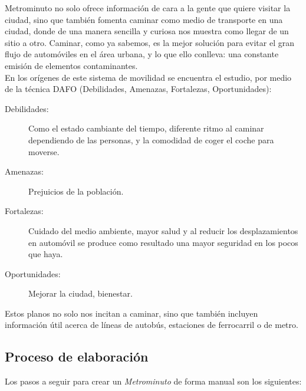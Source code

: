 Metrominuto no solo ofrece información de cara a la gente que quiere visitar la ciudad, sino que también fomenta caminar como medio de transporte en una ciudad, donde de una manera sencilla y curiosa nos muestra como llegar de un sitio a otro. Caminar, como ya sabemos, es la mejor solución para evitar el gran flujo de automóviles en el área urbana, y lo que ello conlleva: una constante emisión de elementos contaminantes.\\


En los orígenes de este sistema de movilidad se encuentra el estudio, por medio de la técnica DAFO (Debilidades, Amenazas, Fortalezas, Oportunidades):

\begin{description}
	\item[Debilidades:] Como el estado cambiante del tiempo, diferente ritmo al caminar dependiendo de las personas, y la comodidad de coger el coche para moverse.
	\item[Amenazas:] Prejuicios de la población.
	\item[Fortalezas:] Cuidado del medio ambiente, mayor salud y al reducir los desplazamientos en automóvil se produce como resultado una mayor seguridad en los pocos que haya.
	\item[Oportunidades:] Mejorar la ciudad, bienestar.
\end{description}
Estos planos no solo nos incitan a caminar, sino que también incluyen información útil acerca de líneas de autobús, estaciones de ferrocarril o de metro.

\subsection{Proceso de elaboración}
Los pasos a seguir para crear un \textit{Metrominuto} de forma manual son los siguientes:

